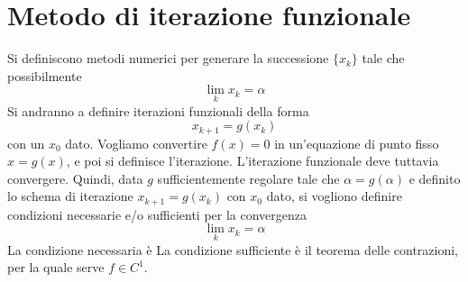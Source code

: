 \documentclass[a4paper]{article}
\begin{document}
\section{Metodo di iterazione funzionale}

Si definiscono metodi numerici per generare la successione
\(\{x_k\}\) tale che possibilmente
\[
    \lim_{k} x_k = \alpha
\]
Si andranno a definire iterazioni funzionali della forma
\[
    x_{k+1} = g(x_k)
\]
con un \(x_0\) dato. Vogliamo convertire \(f(x)=0\) in un'equazione di punto fisso
\(x=g(x)\), e poi si definisce l'iterazione.
L'iterazione funzionale deve tuttavia convergere. Quindi, data \(g\)
sufficientemente regolare tale che \(\alpha = g(\alpha)\)
e definito lo schema di iterazione \(x_{k+1} = g(x_k)\) con \(x_0\) dato,
si vogliono definire condizioni necessarie e/o sufficienti per la convergenza
\[
    \lim_k x_k = \alpha
\]
La condizione necessaria è
\sproof{}{
    \[
        \alpha = \lim_k x_k = \lim_k x_{k+1} = \lim_k g(x_k)
    \]
}
La condizione sufficiente è il teorema delle contrazioni, per la quale serve \(f\in C^1\).
\end{document}
